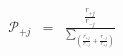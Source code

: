 \begin{eqnarray}
{\mathcal P}_{+j}  & = & \frac{\frac{r_{+j}}{r_{-j}}}{\sum_\left(\frac{r_{+j}}{r_{-j}} + \frac{r_{-j}}{r_{+j}}  \right)} \\
\end{eqnarray}